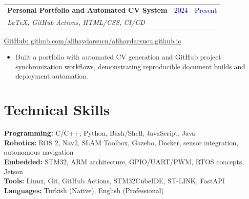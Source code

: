 \documentclass[10pt,letterpaper]{article}
\makeatletter
\newif\ifallcv
\newcommand{\entry}[4]{%
  \begin{tabularx}{\textwidth}{@{}Xr@{}}
    \textbf{#1} & \textcolor{navy}{#2}\\
    \textit{#3} & \textit{#4}
  \end{tabularx}\vspace{1pt}}
\makeatother
\begin{document}
\entry{Personal Portfolio and Automated CV System}{2024 - Present}
      {LaTeX, GitHub Actions, HTML/CSS, CI/CD}{}
\small\href{https://github.com/alihaydarsucu/alihaydarsucu.github.io}{GitHub: github.com/alihaydarsucu/alihaydarsucu.github.io}
\begin{itemize}
  \item Built a portfolio with automated CV generation and GitHub project synchronization workflows, demonstrating reproducible document builds and deployment automation.
\end{itemize}

\ifallcv
  \Needspace{8\baselineskip}
  \entry{Focus and Activity Tracking for Linux}{2025}
        {FocusPath - C++, Qt, X11, SVG, Linux}{}
  \small\href{https://github.com/alihaydarsucu/FocusPath}{GitHub: github.com/alihaydarsucu/FocusPath}
  \begin{itemize}
    \item Built a low-level Linux desktop application that captures X11 window events and logs activity as JSONL for focus and distraction analysis.
    \item Generated SVG timelines, pie charts and usage reports from recorded desktop activity.
  \end{itemize}
  \vspace{2pt}

  \Needspace{7\baselineskip}
  \entry{Batch GitHub Repository Puller}{2025}
        {GitHubPuller - Python, GTK4, libadwaita, Linux}{}
  \small\href{https://github.com/alihaydarsucu/GitHubPuller}{GitHub: github.com/alihaydarsucu/GitHubPuller}
  \begin{itemize}
    \item Developed a native Linux desktop utility for batch-cloning and updating multiple GitHub repositories from one interface.
    \item Built the desktop UI with GTK4 and libadwaita, focusing on clear repository selection and repeatable update workflows.
  \end{itemize}
\fi

\section{Technical Skills}
\textbf{Programming:} C/C++, Python, Bash/Shell, JavaScript, Java \\
\textbf{Robotics:} ROS 2, Nav2, SLAM Toolbox, Gazebo, Docker, sensor integration, autonomous navigation \\
\textbf{Embedded:} STM32, ARM architecture, GPIO/UART/PWM, RTOS concepts, Jetson \\
\textbf{Tools:} Linux, Git, GitHub Actions, STM32CubeIDE, ST-LINK, FastAPI \\
\textbf{Languages:} Turkish (Native), English (Professional)
\end{document}
